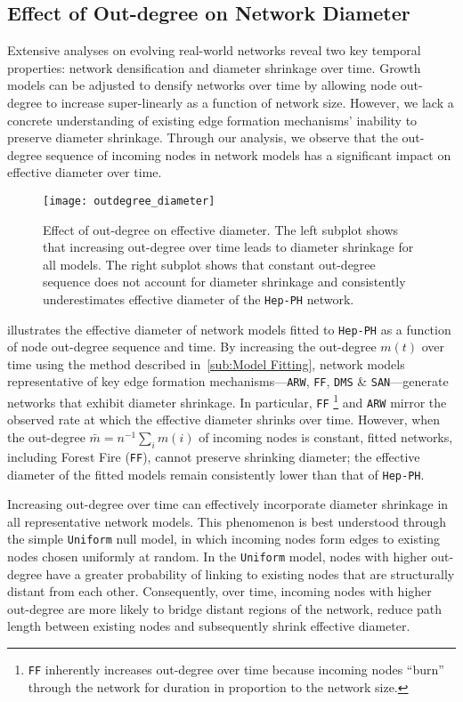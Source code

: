 \subsection{Effect of Out-degree on Network Diameter}
Extensive analyses \cite{hu2009evolution,mcglohon2011statistical,leskovec2005graphs} on evolving
real-world networks reveal two key temporal properties: network densification and diameter
shrinkage over time. Growth models can be adjusted to densify networks over time
by allowing node out-degree to increase super-linearly as a
function of network size. However, we lack a concrete understanding of existing
edge formation mechanisms' inability to preserve diameter shrinkage. Through our
analysis, we observe that the out-degree sequence of incoming nodes in
network models has a significant impact on effective diameter over time.
\begin{figure}
 \vspace{-10pt}
 \centering
 \texttt{[image: outdegree\_diameter]}
 \caption{
 Effect of out-degree on effective diameter.
 The left subplot shows that increasing out-degree over time leads to diameter
 shrinkage for all models. The right subplot shows that
 constant out-degree sequence does not account for diameter
 shrinkage and consistently underestimates effective diameter of the \texttt{Hep-PH}
 network.}
 \label{fig:diameter}
 \vspace{-10pt}
\end{figure}

 illustrates the effective diameter of network models fitted
to \texttt{Hep-PH} as a function of node out-degree sequence and time.
By increasing the
out-degree $m(t)$ over time using the method described
in~\cref{sub:Model Fitting}, network models representative of key edge formation
mechanisms---\texttt{ARW}, \texttt{FF}, \texttt{DMS} \&
\texttt{SAN}---generate networks that exhibit diameter shrinkage. In particular,
\texttt{FF} \footnote{\texttt{FF} inherently increases out-degree over time
because incoming nodes ``burn'' through the network for duration in proportion
to the network size.} and \texttt{ARW} mirror the observed rate at which the
effective diameter shrinks over time.
However, when the out-degree $\bar{m}=n^{-1}\sum_i m(i)$ of incoming nodes is constant,
fitted networks, including Forest Fire (\texttt{FF}), cannot preserve
shrinking diameter; the effective diameter of the fitted models remain
consistently lower than that of \texttt{Hep-PH}.

Increasing out-degree over time can effectively incorporate diameter shrinkage
in all representative network models. This phenomenon is best understood through
the simple \texttt{Uniform} null model, in which incoming nodes form edges to
existing nodes chosen uniformly at random. In the \texttt{Uniform} model, nodes with higher out-degree
have a greater probability of linking to existing
nodes that are structurally distant from each other. Consequently, over time,
incoming nodes with higher out-degree are more likely to bridge distant regions
of the network, reduce path length between existing nodes and subsequently
shrink effective diameter.

